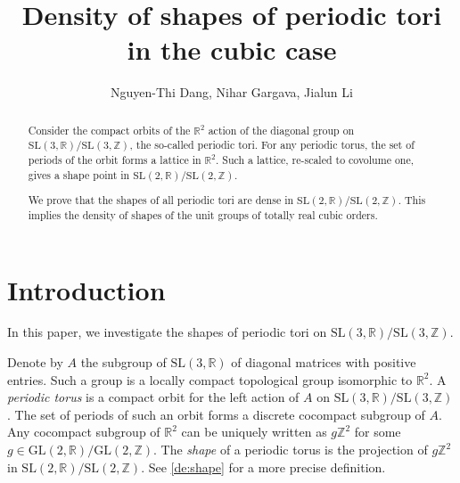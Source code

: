 \documentclass[11pt,letterpaper]{amsart}
\title{Density of shapes of periodic tori in the cubic case 
}
\author{Nguyen-Thi Dang, Nihar Gargava, Jialun Li}
\date{}
\theoremstyle{definition}
\theoremstyle{remark}
\renewcommand{\rm}[1]{\mathrm{#1}}
\newcommand{\bb}[1]{\mathbb{#1}}
\newcommand{\R}{\bb R}
\newcommand{\Z}{\bb Z}
\newcommand{\SL}{\rm{SL}}
\newcommand{\GL}{\rm{GL}}
\begin{document}
	\begin{abstract}
		Consider the compact orbits of the $\mathbb{R}^2$ action of the diagonal group on $\SL(3,\R)/\SL (3,\Z)$, the so-called periodic tori.
		For any periodic torus, the set of periods of the orbit forms a lattice in $\mathbb{R}^2$.
		Such a lattice, re-scaled  to covolume one, gives a shape point in $\SL (2,\R)/\SL(2,\Z)$.
		
		We prove that the shapes of all periodic tori are dense in $\SL (2,\R)/\SL(2,\Z)$. 
		This implies the density of shapes of the unit groups of totally real cubic orders.
	\end{abstract}
	\maketitle
	

	
	\section{Introduction}
	
	In this paper, we investigate the shapes of periodic tori on $\SL(3,\mathbb{R})/\SL(3,\mathbb{Z})$.
	
	Denote by $A$ the subgroup of $\SL(3,\mathbb{R})$ of diagonal matrices with positive entries.
	Such a group is a locally compact topological group isomorphic to $\R^2$.
	A \emph{periodic torus} is a compact orbit for the left action of $A$ on $\SL(3,\R)/\SL(3,\Z)$.
    The set of periods of such an orbit  forms a discrete cocompact subgroup of $A$. 
    Any cocompact subgroup of $\R^2$ can be uniquely written as $g \Z^2$ for some $g \in \GL(2,\R)/\GL(2,\Z)$. 
    The \emph{shape} of a periodic torus is the projection of $g\Z^2$ in $\SL(2,\R)/\SL(2,\Z)$. 
    See \cref{de:shape} for a more precise definition.
    
\end{document}
